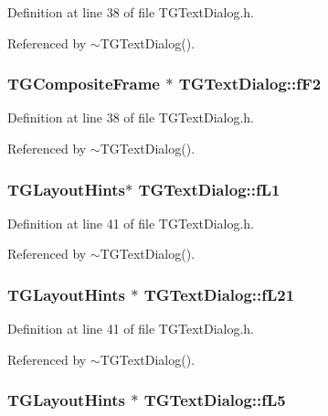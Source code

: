 Definition at line 38 of file TGTextDialog.h.

Referenced by $\sim$TGTextDialog().
\subsubsection[{fF2}]{\setlength{\rightskip}{0pt plus 5cm}TGCompositeFrame $\ast$ {\bf TGTextDialog::fF2}\hspace{0.3cm}{\ttfamily  [protected]}}\label{classTGTextDialog_a0fce6ff03f2f8b7862812821e6b22359}


Definition at line 38 of file TGTextDialog.h.

Referenced by $\sim$TGTextDialog().
\subsubsection[{fL1}]{\setlength{\rightskip}{0pt plus 5cm}TGLayoutHints$\ast$ {\bf TGTextDialog::fL1}\hspace{0.3cm}{\ttfamily  [protected]}}\label{classTGTextDialog_a6f42d7eb4f88d57988289e4b524c80af}


Definition at line 41 of file TGTextDialog.h.

Referenced by $\sim$TGTextDialog().
\subsubsection[{fL21}]{\setlength{\rightskip}{0pt plus 5cm}TGLayoutHints $\ast$ {\bf TGTextDialog::fL21}\hspace{0.3cm}{\ttfamily  [protected]}}\label{classTGTextDialog_a53a7e42e209faded453d0c3df900e531}


Definition at line 41 of file TGTextDialog.h.

Referenced by $\sim$TGTextDialog().
\subsubsection[{fL5}]{\setlength{\rightskip}{0pt plus 5cm}TGLayoutHints $\ast$ {\bf TGTextDialog::fL5}\hspace{0.3cm}{\ttfamily  [protected]}}\label{classTGTextDialog_acf68738a98af7d27803a0928861bcffa}


